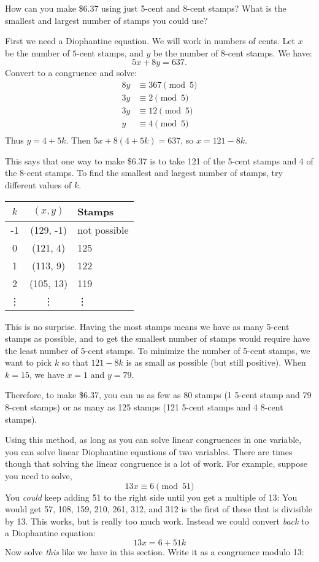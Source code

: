 \documentclass[12pt]{article}
\begin{document}
\begin{example}
	How can you make \$6.37 using just 5-cent and 8-cent stamps?  What is the smallest and largest number of stamps you could use?
	
	\begin{solution}
		First we need a Diophantine equation.  We will work in numbers of cents.  Let $x$ be the number of $5$-cent stamps, and $y$ be the number of 8-cent stamps.  We have:
		\[5x + 8y = 637.\]
		Convert to a congruence and solve:
		\[
		\begin{aligned}
			8y & \equiv 367 \pmod{5}\\
				3y & \equiv 2 \pmod 5\\
				3y & \equiv 12 \pmod 5\\
				y & \equiv 4 \pmod 5\\
		\end{aligned}
		\]
		Thus $y = 4 + 5k$.  Then $5x + 8(4+5k) = 637$, so $x = 121 - 8k$.
		
		This says that one way to make \$6.37 is to take 121 of the 5-cent stamps and 4 of the 8-cent stamps.  To find the smallest and largest number of stamps, try different values of $k$.
		
		\begin{tabular}{c|c|l}
			$k$ & $(x,y)$ & Stamps\\ \hline
			-1 & (129, -1) & not possible \\
			0 & (121, 4) & 125 \\
			1 & (113, 9) & 122 \\
			2 & (105, 13) & 119 \\
			\vdots & \vdots & \vdots
		\end{tabular}
		
		This is no surprise.  Having the most stamps means we have as many 5-cent stamps as possible, and to get the smallest number of stamps would require have the least number of 5-cent stamps.  To minimize the number of 5-cent stamps, we want to pick $k$ so that $121-8k$ is as small as possible (but still positive).  When $k = 15$, we have $x = 1$ and $y = 79$.
		
		Therefore, to make \$6.37, you can us as few as 80 stamps (1 5-cent stamp and 79 8-cent stamps) or as many as 125 stamps (121 5-cent stamps and 4 8-cent stamps).
	\end{solution}
\end{example}

Using this method, as long as you can solve linear congruences in one variable, you can solve linear Diophantine equations of two variables.  There are times though that solving the linear congruence is a lot of work.  For example, suppose you need to solve,
\[13x \equiv 6 \pmod{51}\]
You {\em could} keep adding 51 to the right side until you get a multiple of 13: You would get 57, 108, 159, 210, 261, 312, and 312 is the first of these that is divisible by 13.  This works, but is really too much work.  Instead we could convert {\em back} to a Diophantine equation:
\[13x = 6 + 51k\]
Now solve {\em this} like we have in this section.  Write it as a congruence modulo 13:
\end{document}
